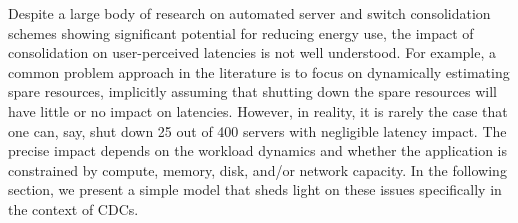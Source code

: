 Despite a large body of research on automated server and switch consolidation schemes showing significant potential for reducing energy use, the impact of consolidation on user-perceived latencies is not well understood. 
For example, a common problem approach in the literature \cite{mathew12, Jain} is to focus on dynamically estimating spare resources, implicitly assuming that shutting down the spare resources will have little or no impact on latencies. However, in reality, it is rarely the case that one can, say, shut down 25 out of 400 servers with negligible latency impact. The precise impact depends on the workload dynamics and whether the application is constrained by compute, memory, disk, and/or network capacity. In the following section, we present a simple model that sheds light on these issues specifically in the context of CDCs.




%



